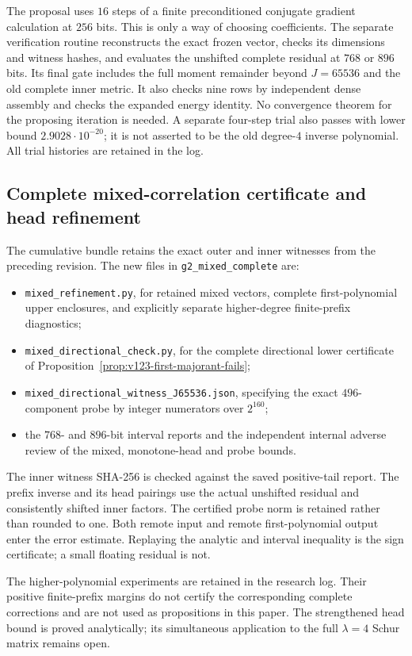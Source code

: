 \documentclass[11pt]{article}
\theoremstyle{remark}
\begin{document}
The proposal uses $16$ steps of a finite preconditioned conjugate
gradient calculation at $256$ bits. This is only a way of choosing
coefficients. The separate verification routine reconstructs the
exact frozen vector, checks its dimensions and witness hashes,
and evaluates the unshifted complete residual at $768$ or $896$
bits. Its final gate includes the full moment remainder beyond
$J=65536$ and the old complete inner metric. It also checks nine
rows by independent dense assembly and checks the expanded energy
identity. No convergence theorem for the proposing iteration is
needed. A separate four-step trial also passes with lower bound
$2.9028\cdot10^{-20}$; it is not asserted to be the old degree-$4$
inverse polynomial. All trial histories are retained in the log.

\subsection*{Complete mixed-correlation certificate and head refinement}
\label{app:v123-mixed}
The cumulative bundle retains the exact outer and inner witnesses
from the preceding revision. The new files in
\texttt{g2\_mixed\_complete} are:
\begin{itemize}[nosep]
\item \nolinkurl{mixed_refinement.py}, for retained mixed vectors,
complete first-polynomial upper enclosures, and explicitly separate
higher-degree finite-prefix diagnostics;
\item \nolinkurl{mixed_directional_check.py}, for the complete
directional lower certificate of
Proposition~\ref{prop:v123-first-majorant-fails};
\item \nolinkurl{mixed_directional_witness_J65536.json}, specifying
the exact $496$-component probe by integer numerators over $2^{160}$;
\item the $768$- and $896$-bit interval reports and the independent
internal adverse review of the mixed, monotone-head and probe bounds.
\end{itemize}
The inner witness SHA-256 is checked against the saved positive-tail
report. The prefix inverse and its head pairings use the actual
unshifted residual and consistently shifted inner factors. The
certified probe norm is retained rather than rounded to one.
Both remote input and remote first-polynomial output enter the
error estimate. Replaying the analytic and interval inequality is
the sign certificate; a small floating residual is not.

The higher-polynomial experiments are retained in the research log.
Their positive finite-prefix margins do not certify the corresponding
complete corrections and are not used as propositions in this paper.
The strengthened head bound is proved analytically; its simultaneous
application to the full $\lambda=4$ Schur matrix remains open.
\end{document}
